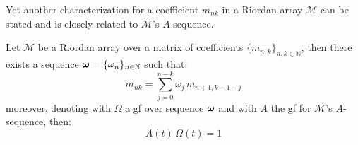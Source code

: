 Yet another characterization for a coefficient $m_{nk}$ in a Riordan array $\mathcal{M}$
can be stated and is closely related to $\mathcal{M}$'s $A$-sequence.
\begin{theorem}
    Let $\mathcal{M}$ be a Riordan array over a matrix of coefficients
    $\lbrace m_{n,k}\rbrace_{n,k\in\mathbb{N}}$, then there exists a sequence
    $\boldsymbol{\omega}=\lbrace \omega_{n}\rbrace_{n\in\mathbb{N}}$ such that:
    \begin{displaymath}
        m_{nk}=\sum_{j=0}^{n-k}{\omega_{j}\,m_{n+1,k+1+j}}
    \end{displaymath}
    moreover, denoting with $\Omega$ a \ac{gf} over sequence $\boldsymbol{\omega}$ and
    with $A$ the \ac{gf} for $\mathcal{M}$'s $A$-sequence, then:
    \begin{displaymath}
        A(t)\,\Omega(t)=1
    \end{displaymath}
    \label{thm:characterization:next:row}
\end{theorem}
